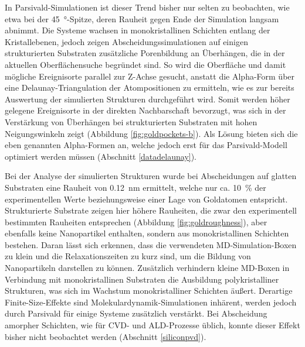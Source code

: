 In Parsivald-Simulationen ist dieser Trend bisher nur selten zu beobachten, wie etwa bei der \SI{45}{\degree}-Spitze, deren Rauheit gegen Ende der Simulation langsam abnimmt.
Die Systeme wachsen in monokristallinen Schichten entlang der Kristallebenen, jedoch zeigen Abscheidungssimulationen auf einigen strukturierten Substraten zusätzliche Porenbildung an Überhängen, die in der aktuellen Oberflächensuche begründet sind.
So wird die Oberfläche und damit mögliche Ereignisorte parallel zur Z-Achse gesucht, anstatt die Alpha-Form über eine Delaunay-Triangulation der Atompositionen zu ermitteln, wie es zur bereits Auswertung der simulierten Strukturen durchgeführt wird.
Somit werden höher gelegene Ereignisorte in der direkten Nachbarschaft bevorzugt, was sich in der Verstärkung von Überhängen bei strukturierten Substraten mit hohen Neigungswinkeln zeigt (Abbildung \ref{fig:goldpockets-b}).
Als Lösung bieten sich die eben genannten Alpha-Formen an, welche jedoch erst für das Parsivald-Modell optimiert werden müssen (Abschnitt \ref{datadelaunay}).

Bei der Analyse der simulierten Strukturen wurde bei Abscheidungen auf glatten Substraten eine Rauheit von \SI{0.12}{\nano\meter} ermittelt, welche nur ca. \SI{10}{\percent} der experimentellen Werte beziehungsweise einer Lage von Goldatomen entspricht.
Strukturierte Substrate zeigen hier höhere Rauheiten, die zwar den experimentell bestimmten Rauheiten entsprechen (Abbildung \ref{fig:goldroughness}), aber ebenfalls keine Nanopartikel enthalten, sondern aus monokristallinen Schichten bestehen.
Daran lässt sich erkennen, dass die verwendeten MD-Simulation-Boxen zu klein und die Relaxationszeiten zu kurz sind, um die Bildung von Nanopartikeln darstellen zu können.
Zusätzlich verhindern kleine MD-Boxen in Verbindung mit monokristallinen Substraten die Ausbildung polykristalliner Strukturen, was sich im Wachstum monokristalliner Schichten äußert.
Derartige Finite-Size-Effekte sind Molekulardynamik-Simulationen inhärent, werden jedoch durch Parsivald für einige Systeme zusätzlich verstärkt.
Bei Abscheidung amorpher Schichten, wie für CVD- und ALD-Prozesse üblich, konnte dieser Effekt bisher nicht beobachtet werden (Abschnitt \ref{siliconpvd}).

